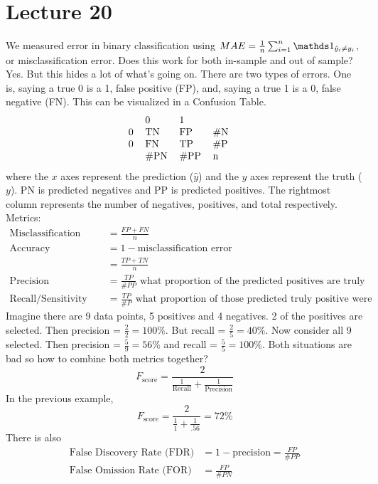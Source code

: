 \documentclass[12pt]{article}
\begin{document}
\section{Lecture 20} 
We measured error in binary classification using $MAE = \frac{1}{n}\sum_{i=1}^n \indicator{\hat{y}_i \neq y_i}$, or misclassification error. Does this work for both in-sample and out of sample? Yes. But this hides a lot of what's going on. There are two types of errors. One is, saying a true 0 is a 1, false positive (FP), and, saying a true 1 is a 0, false negative (FN). This can be visualized in a Confusion Table. $$ \begin{tabular}{lllll}
  & 0    & 1    &     &  \\
0 & TN   & FP   & \#N &  \\
0 & FN   & TP   & \#P &  \\
  & \#PN & \#PP & n   & 
\end{tabular} $$ where the $x$ axes represent the prediction ($\hat{y}$) and the $y$ axes represent the truth ($y$). PN is predicted negatives and PP is predicted positives. The rightmost column represents the number of negatives, positives, and total respectively. \\
Metrics: $$ \begin{aligned} \text{Misclassification Error} &= \frac{FP + FN}{n} \\ \text{Accuracy} &= 1 - \text{misclassification error} \\ &= \frac{TP + TN}{n} \\ \text{Precision} &= \frac{TP}{\#PP} \text{ what proportion of the predicted positives are truly positives?} \\ \text{Recall/Sensitivity} &= \frac{TP}{\#P} \text{ what proportion of those predicted truly positive were predicted positives?} \end{aligned} $$ 
Imagine there are 9 data points, 5 positives and 4 negatives. 2 of the positives are selected. Then precision = $\frac{2}{2} = 100\%$. But recall = $\frac{2}{5} = 40\%$. Now consider all 9 selected. Then precision = $\frac{5}{9} = 56\%$ and recall = $\frac{5}{5} = 100\%$. Both situations are bad so how to combine both metrics together? 
$$F_{\text{score}} = \frac{2}{\frac{1}{\text{Recall}} + \frac{1}{\text{Precision}}} $$ In the previous example, $$ F_{\text{score}} = \frac{2}{\frac{1}{1} + \frac{1}{.56}} = 72\%$$ 
There is also $$ \begin{aligned} \text{False Discovery Rate (FDR)} &= 1 - \text{precision} = \frac{FP}{\#PP} \\ \text{False Omission Rate (FOR)} &= \frac{FP}{\#PN} \end{aligned} $$ 
\end{document}
